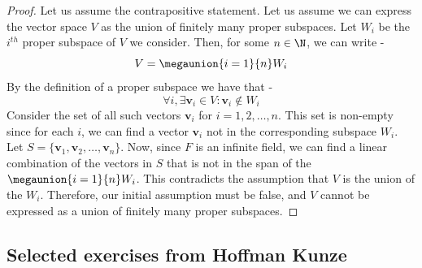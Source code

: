 \documentclass[openany]{book}
\begin{document}
\begin{proof}
Let us assume the contrapositive statement. Let us assume we can express the vector space $V$ as the union of finitely many proper subspaces. Let $W_i$ be the $i^{th}$ proper subspace of $V$ we consider. 
Then, for some $n \in \N$, we can write - 
$$V = \megaunion{i = 1}{n} W_i$$ 
By the definition of a proper subspace we have that - 
$$\forall i, \exists \mathbf{v}_i \in V: \mathbf{v}_i \notin W_i$$
Consider the set of all such vectors $\mathbf{v}_i$ for $i = 1, 2, \ldots, n$. This set is non-empty since for each $i$, we can find a vector $\mathbf{v}_i$ not in the corresponding subspace $W_i$. Let $S = \{\mathbf{v}_1, \mathbf{v}_2, \ldots, \mathbf{v}_n\}$. 
Now, since $F$ is an infinite field, we can find a linear combination of the vectors in $S$ that is not in the span of the $\megaunion{i=1}{n}W_i$. This contradicts the assumption that $V$ is the union of the $W_i$. Therefore, our initial assumption must be false, and $V$ cannot be expressed as a union of finitely many proper subspaces.
\end{proof}
\subsection{Selected exercises from Hoffman Kunze}
\end{document}
